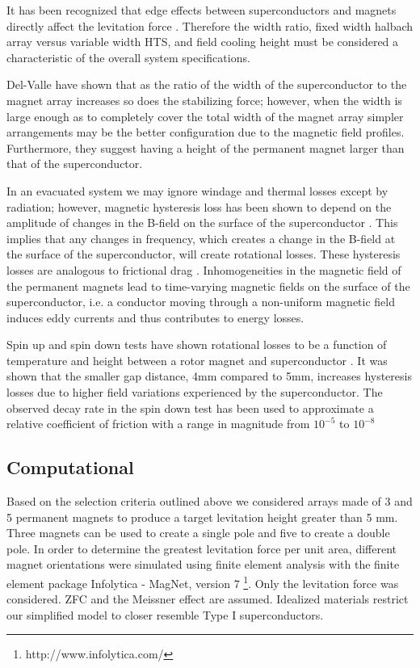 It has been recognized that edge effects between superconductors and magnets directly affect the levitation force \cite{ma, Jing}.  Therefore the width ratio, fixed width halbach array versus variable width HTS, and field cooling height must be considered a characteristic of the overall system specifications.

Del-Valle \cite{del1} have shown that as the ratio of the width of the superconductor to the magnet array increases so does the stabilizing force; however, when the width is large enough as to completely cover the total width of the magnet array simpler arrangements may be the better configuration due to the magnetic field profiles.  Furthermore, they suggest having a height of the permanent magnet larger than that of the superconductor.

In an evacuated system we may ignore windage and thermal losses except by radiation; however, magnetic hysteresis loss has been shown to depend on the amplitude of changes in the B-field on the surface of the superconductor \cite{coombs003}.  This implies that any changes in frequency, which creates a change in the B-field at the surface of the superconductor, will create rotational losses.  These hysteresis losses are analogous to frictional drag \cite{ma}\cite{turner}.  Inhomogeneities in the magnetic field of the permanent magnets lead to time-varying magnetic fields on the surface of the superconductor, i.e. a conductor moving through a non-uniform magnetic field induces eddy currents and thus contributes to energy losses.

Spin up and spin down tests have shown rotational losses to be a function of temperature and height between a rotor magnet and superconductor \cite{cansiz,  werfel}.  It was shown that the smaller gap distance, 4mm compared to 5mm, increases hysteresis losses due to higher field variations experienced by the superconductor.  The observed decay rate in the spin down test has been used to approximate a relative coefficient of friction with a range in magnitude from $10^{-5}$ to $10^{-8}$ \cite{cansiz}

\subsection{Computational}
Based on the selection criteria outlined above we considered arrays made of 3 and 5 permanent magnets to produce a target levitation height greater than 5 mm. Three magnets can be used to create a single pole and five to create a double pole.  In order to determine the greatest levitation force per unit area, different magnet orientations were simulated using finite element analysis with the finite element package Infolytica - MagNet, version 7 \footnote{http://www.infolytica.com/}.  Only the levitation force was considered.  ZFC and the Meissner effect are assumed.  Idealized materials restrict our simplified model to closer resemble Type I superconductors.

